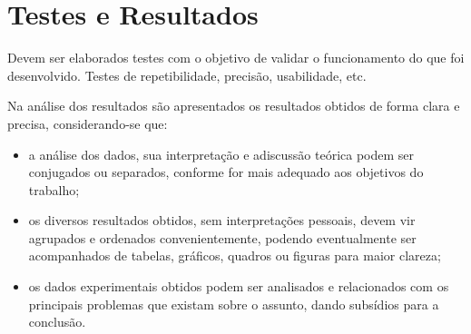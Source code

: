 \chapter{Testes e Resultados}

Devem ser elaborados testes com o objetivo de validar o funcionamento do que foi desenvolvido. Testes de repetibilidade, precisão, usabilidade, etc. 

Na análise dos resultados são apresentados os resultados obtidos de forma clara e precisa, considerando-se que:

\begin{itemize}
    \item a análise dos dados, sua interpretação e adiscussão teórica podem ser conjugados ou separados, conforme for mais adequado aos objetivos do trabalho;
    \item os diversos resultados obtidos, sem interpretações pessoais, devem vir agrupados e ordenados convenientemente, podendo eventualmente ser acompanhados de tabelas, gráficos, quadros ou figuras para maior clareza;
    \item os dados experimentais obtidos podem ser analisados e relacionados com os principais problemas que existam sobre o assunto, dando subsídios para a conclusão.
\end{itemize}